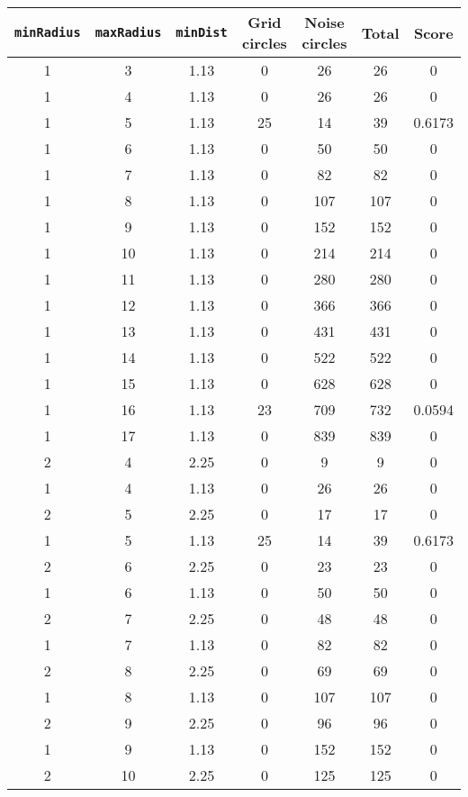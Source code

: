 \documentclass[letterpaper, 12pt]{article}
\begin{document}
\begin{longtable}{|c|c|c|c|c|c|c|}
\hline
\textbf{\texttt{minRadius}} & \textbf{\texttt{maxRadius}} & \textbf{\texttt{minDist}} & \textbf{Grid circles} & \textbf{Noise circles} & \textbf{Total} & \textbf{Score} \\
\hline
1 & 3 & 1.13 & 0 & 26 & 26 & 0 \\
\hline
1 & 4 & 1.13 & 0 & 26 & 26 & 0 \\
\hline
1 & 5 & 1.13 & 25 & 14 & 39 & 0.6173 \\
\hline
1 & 6 & 1.13 & 0 & 50 & 50 & 0 \\
\hline
1 & 7 & 1.13 & 0 & 82 & 82 & 0 \\
\hline
1 & 8 & 1.13 & 0 & 107 & 107 & 0 \\
\hline
1 & 9 & 1.13 & 0 & 152 & 152 & 0 \\
\hline
1 & 10 & 1.13 & 0 & 214 & 214 & 0 \\
\hline
1 & 11 & 1.13 & 0 & 280 & 280 & 0 \\
\hline
1 & 12 & 1.13 & 0 & 366 & 366 & 0 \\
\hline
1 & 13 & 1.13 & 0 & 431 & 431 & 0 \\
\hline
1 & 14 & 1.13 & 0 & 522 & 522 & 0 \\
\hline
1 & 15 & 1.13 & 0 & 628 & 628 & 0 \\
\hline
1 & 16 & 1.13 & 23 & 709 & 732 & 0.0594 \\
\hline
1 & 17 & 1.13 & 0 & 839 & 839 & 0 \\
\hline
2 & 4 & 2.25 & 0 & 9 & 9 & 0 \\
\hline
1 & 4 & 1.13 & 0 & 26 & 26 & 0 \\
\hline
2 & 5 & 2.25 & 0 & 17 & 17 & 0 \\
\hline
1 & 5 & 1.13 & 25 & 14 & 39 & 0.6173 \\
\hline
2 & 6 & 2.25 & 0 & 23 & 23 & 0 \\
\hline
1 & 6 & 1.13 & 0 & 50 & 50 & 0 \\
\hline
2 & 7 & 2.25 & 0 & 48 & 48 & 0 \\
\hline
1 & 7 & 1.13 & 0 & 82 & 82 & 0 \\
\hline
2 & 8 & 2.25 & 0 & 69 & 69 & 0 \\
\hline
1 & 8 & 1.13 & 0 & 107 & 107 & 0 \\
\hline
2 & 9 & 2.25 & 0 & 96 & 96 & 0 \\
\hline
1 & 9 & 1.13 & 0 & 152 & 152 & 0 \\
\hline
2 & 10 & 2.25 & 0 & 125 & 125 & 0 \\

\end{longtable}
\end{document}
